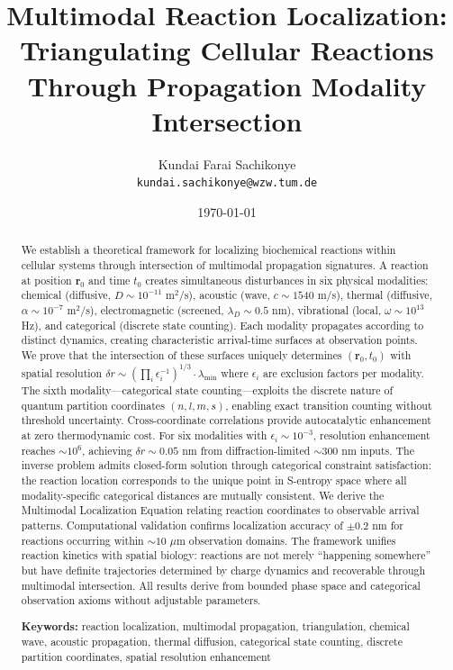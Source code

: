 \documentclass[11pt,a4paper]{article}
\title{\textbf{Multimodal Reaction Localization: \\Triangulating Cellular Reactions Through Propagation Modality Intersection}}
\author{
    Kundai Farai Sachikonye\\
    \texttt{kundai.sachikonye@wzw.tum.de}
}
\date{\today}
\theoremstyle{remark}
\newcommand{\rxnpos}{\mathbf{r}_0}
\newcommand{\rxntime}{t_0}
\begin{document}
\maketitle

\begin{abstract}
We establish a theoretical framework for localizing biochemical reactions within cellular systems through intersection of multimodal propagation signatures. A reaction at position $\rxnpos$ and time $\rxntime$ creates simultaneous disturbances in six physical modalities: chemical (diffusive, $D \sim 10^{-11}$ m$^2$/s), acoustic (wave, $c \sim 1540$ m/s), thermal (diffusive, $\alpha \sim 10^{-7}$ m$^2$/s), electromagnetic (screened, $\lambda_D \sim 0.5$ nm), vibrational (local, $\omega \sim 10^{13}$ Hz), and categorical (discrete state counting). Each modality propagates according to distinct dynamics, creating characteristic arrival-time surfaces at observation points. We prove that the intersection of these surfaces uniquely determines $(\rxnpos, \rxntime)$ with spatial resolution $\delta r \sim (\prod_i \epsilon_i^{-1})^{1/3} \cdot \lambda_{\min}$ where $\epsilon_i$ are exclusion factors per modality. The sixth modality---categorical state counting---exploits the discrete nature of quantum partition coordinates $(n, l, m, s)$, enabling exact transition counting without threshold uncertainty. Cross-coordinate correlations provide autocatalytic enhancement at zero thermodynamic cost. For six modalities with $\epsilon_i \sim 10^{-3}$, resolution enhancement reaches $\sim 10^6$, achieving $\delta r \sim 0.05$ nm from diffraction-limited $\sim 300$ nm inputs. The inverse problem admits closed-form solution through categorical constraint satisfaction: the reaction location corresponds to the unique point in S-entropy space where all modality-specific categorical distances are mutually consistent. We derive the Multimodal Localization Equation relating reaction coordinates to observable arrival patterns. Computational validation confirms localization accuracy of $\pm 0.2$ nm for reactions occurring within $\sim 10$ $\mu$m observation domains. The framework unifies reaction kinetics with spatial biology: reactions are not merely ``happening somewhere'' but have definite trajectories determined by charge dynamics and recoverable through multimodal intersection. All results derive from bounded phase space and categorical observation axioms without adjustable parameters.

\textbf{Keywords:} reaction localization, multimodal propagation, triangulation, chemical wave, acoustic propagation, thermal diffusion, categorical state counting, discrete partition coordinates, spatial resolution enhancement
\end{abstract}
\end{document}
